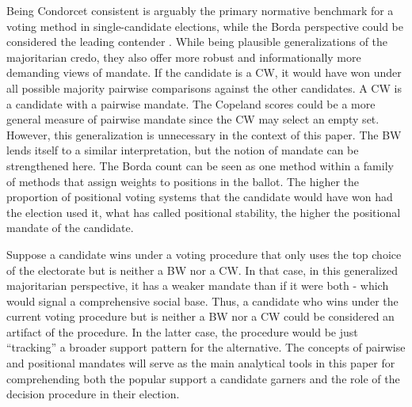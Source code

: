 \documentclass[hidelinks,11pt]{article} \usepackage[utf8]{inputenc}
\begin{document}
Being Condorcet consistent is arguably the primary normative benchmark for a voting method in single-candidate elections, while the Borda perspective could be considered the leading contender \parencite{regenwetter2006behavioral,   felsenthal2011review, nurmi2002voting}. While being plausible generalizations of the majoritarian credo, they also offer more robust and informationally more demanding views of mandate. If the candidate is a CW, it would have won under all possible majority pairwise comparisons against the other candidates. A CW is a candidate with a pairwise mandate. The Copeland scores could be a more general measure of pairwise mandate since the CW may select an empty set. However, this generalization is unnecessary in the context of this paper. The BW lends itself to a similar interpretation, but the notion of mandate can be strengthened here. The Borda count can be seen as one method within a family of methods that assign weights to positions in the ballot. The higher the proportion of positional voting systems that the candidate would have won had the election used it, what \textcite{tabarrok2001president} has called positional stability, the higher the positional mandate of the candidate.

Suppose a candidate wins under a voting procedure that only uses the top choice of the electorate but is neither a BW nor a CW. In that case, in this generalized majoritarian perspective, it has a weaker mandate than if it were both - which would signal a comprehensive social base. Thus, a candidate who wins under the current voting procedure but is neither a BW nor a CW could be considered an artifact of the procedure. In the latter case, the procedure would be just ``tracking'' a broader support pattern for the alternative. The concepts of pairwise and positional mandates will serve as the main analytical tools in this paper for comprehending both the popular support a candidate garners and the role of the decision procedure in their election.
\end{document}
